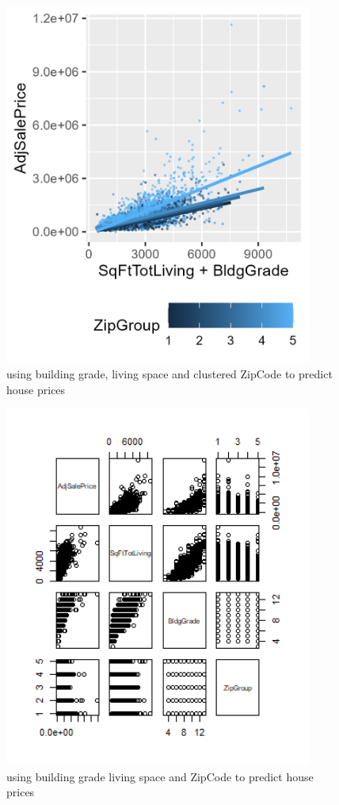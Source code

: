 \documentclass[12pt,letterpaper]{article}
\begin{document}
	\begin{figure}
		  \includegraphics[width=0.9\textwidth]{ZipGroup.png}
		  \caption{using building grade, living space and clustered ZipCode to predict house prices }
		  
	\end{figure}


	\begin{figure}
		  \includegraphics[width=0.9\textwidth]{model_pairs.png}
		  \caption{using building grade living space and ZipCode to predict house prices }
		  
	\end{figure}
\end{document}
